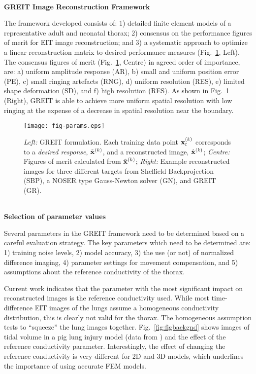 \documentclass[12pt]{article}
\newcommand{\mysection}[1]{
~\\ \noindent
{\bf \normalsize #1}
\vspace{1mm}
}
\begin{document}
\vspace{-3mm}
\mysection{GREIT Image Reconstruction Framework}

The framework developed\cite{GREIT09} consists of: 1)
detailed finite element models of a representative adult
and neonatal thorax; 2) consensus on the performance
figures of merit for EIT image reconstruction; and 3) a
systematic approach to optimize a linear reconstruction
matrix to desired performance measures (Fig.\ \ref{fig:figparams}, Left).
The consensus figures of merit (Fig.\ \ref{fig:figparams}, Centre)
 in agreed order of importance,
are: a) uniform amplitude response (AR), b) small and
uniform position error (PE), c) small ringing artefacts (RNG),
d) uniform resolution (RES), e) limited shape deformation (SD),
and f) high resolution (RES). 
As shown in Fig.\ \ref{fig:figparams} (Right), GREIT is able to 
achieve more uniform spatial resolution with low ringing at the
expense of a decrease in spatial resolution near the boundary.
\vspace{-4mm}
\begin{figure}[htp]
\centering
\texttt{[image: fig-params.eps]}
\vspace{-6mm}
\caption{%
\small
{\em Left:} GREIT formulation. Each training data point
    ${\bf x}_t^{(k)}$ corresponds to a {\em desired response},
$\tilde{\bf x}^{(k)}$, and a reconstructed image,
  $\hat{\bf x}^{(k)}$;
{\em Centre:} Figures of merit calculated from $\hat{\bf x}^{(k)}$;
{\em Right:} Example reconstructed images for three different
targets from
Sheffield Backprojection (SBP), a NOSER type Gauss-Newton solver (GN),
and GREIT (GR).
}
\label{fig:figparams}
\end{figure}

\vspace{-8mm}
\mysection{Selection of parameter values}

Several parameters in the GREIT framework need to be
determined based on a careful evaluation strategy.
The key parameters which need to
be determined are:
1) training noise levels,
2) model accuracy,
3) the use (or not) of normalized difference imaging,
4) parameter settings for movement compensation, and
5) assumptions about the reference conductivity of the thorax.

Current work indicates that the parameter with the most
significant impact on reconstructed images is the
reference conductivity used. While most time-difference EIT
images of the lungs assume a homogeneous conductivity 
distribution, this is clearly not valid for the thorax. 
The homogeneous assumption tests to ``squeeze'' the lung
images together. Fig.\ \ref{fig:figbackgnd} shows images
of tidal volume in a pig lung injury model (data from 
\cite{frerichs03}) and the effect of the reference
conductivity parameter. Interestingly, the effect of changing
the reference conductivity is very different for 2D and 
3D models, which underlines the importance of using accurate
FEM models.
\end{document}
